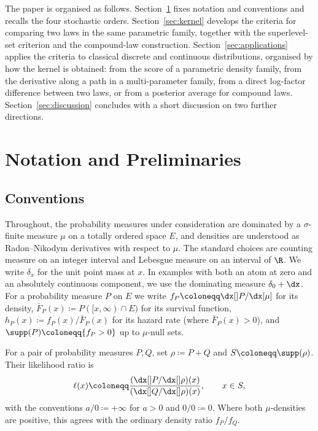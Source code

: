 \documentclass[11pt]{article}
\begin{document}
The paper is organised as follows. Section~\ref{sec:prelim} fixes notation and conventions and recalls the four stochastic orders. Section~\ref{sec:kernel} develops the criteria for comparing two laws in the same parametric family, together with the superlevel-set criterion and the compound-law construction. Section~\ref{sec:applications} applies the criteria to classical discrete and continuous distributions, organised by how the kernel is obtained: from the score of a parametric density family, from the derivative along a path in a multi-parameter family, from a direct log-factor difference between two laws, or from a posterior average for compound laws. Section~\ref{sec:discussion} concludes with a short discussion on two further directions.







\section{Notation and Preliminaries}
\label{sec:prelim}

\subsection{Conventions}\label{subsec:convention}
Throughout, the probability measures under consideration are dominated by a $\sigma$-finite measure $\mu$ on a totally ordered space $E$, and densities are understood as Radon--Nikodym derivatives with respect to $\mu$. The standard choices are counting measure on an integer interval and Lebesgue measure on an interval of $\R$.  We write \(\delta_x\) for the unit point mass at \(x\). In examples with both an atom at zero and an absolutely continuous component, we use the dominating measure \(\delta_0+\dx\). For a probability measure $P$ on $E$ we write $f_P\coloneqq \dx[]P/\dx[\mu]$ for its density, $\bar F_P(x)\coloneqq P([x,\infty)\cap E)$ for its survival function, \(h_P(x)\coloneqq f_P(x)/\bar F_P(x)\) for its hazard rate (where \(\bar F_P(x)>0\)), and $\supp(P)\coloneqq \{f_P>0\}$ up to $\mu$-null sets.

For a pair of probability measures \(P,Q\), set \(\rho\coloneqq P+Q\) and \(S\coloneqq \supp(\rho)\). Their likelihood ratio is
\begin{equation}
\label{def.ell}
\ell(x)\coloneqq  \frac{(\dx[]P/\dx[]\rho)(x)}{(\dx[]Q/\dx[]\rho)(x)}, \qquad x\in S,
\end{equation}
with the conventions \(a/0\coloneqq +\infty\) for \(a>0\) and \(0/0\coloneqq 0\). Where both \(\mu\)-densities are positive, this agrees with the ordinary density ratio \(f_P/f_Q\). 
\end{document}

